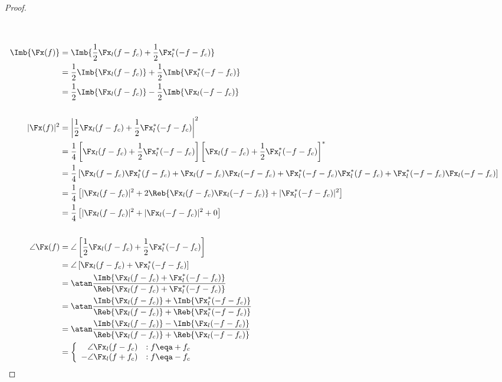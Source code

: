 \begin{proof}
\begin{align*}
\\ \\
   \Imb{\Fx(f)}
     &= \Imb{\frac{1}{2}\Fx_l(f-f_c) + \frac{1}{2}\Fx_l^\ast(-f-f_c)}
   \\&= \frac{1}{2}\Imb{\Fx_l(f-f_c)} + \frac{1}{2}\Imb{\Fx_l^\ast(-f-f_c)}
   \\&= \frac{1}{2}\Imb{\Fx_l(f-f_c)} - \frac{1}{2}\Imb{\Fx_l(-f-f_c)}
\\ \\
   |\Fx(f)|^2
     &= \left| \frac{1}{2}\Fx_l(f-f_c) + \frac{1}{2}\Fx_l^\ast(-f-f_c) \right|^2
   \\&= \frac{1}{4}
        \left[\Fx_l(f-f_c) + \frac{1}{2}\Fx_l^\ast(-f-f_c) \right]
        \left[\Fx_l(f-f_c) + \frac{1}{2}\Fx_l^\ast(-f-f_c) \right]^\ast
   \\&= \frac{1}{4} \left[
        \Fx_l     ( f-f_c) \Fx_l^\ast( f-f_c) +
        \Fx_l     ( f-f_c) \Fx_l     (-f-f_c) +
        \Fx_l^\ast(-f-f_c) \Fx_l^\ast( f-f_c) +
        \Fx_l^\ast(-f-f_c) \Fx_l     (-f-f_c)
        \right]
   \\&= \frac{1}{4} \left[
        |\Fx_l( f-f_c)|^2 +
        2\Reb{\Fx_l     ( f-f_c) \Fx_l     (-f-f_c)} +
        |\Fx_l^\ast(-f-f_c)|^2
        \right]
   \\&= \frac{1}{4} \left[
        |\Fx_l( f-f_c)|^2 + |\Fx_l(-f-f_c)|^2 + 0
        \right]
\\ \\
   \angle\Fx(f)
     &= \angle\left[ \frac{1}{2}\Fx_l(f-f_c) + \frac{1}{2}\Fx_l^\ast(-f-f_c) \right]
   \\&= \angle\left[ \Fx_l(f-f_c) + \Fx_l^\ast(-f-f_c) \right]
   \\&= \atan\frac{\Imb{\Fx_l(f-f_c) + \Fx_l^\ast(-f-f_c) }}
                  {\Reb{\Fx_l(f-f_c) + \Fx_l^\ast(-f-f_c) }}
   \\&= \atan\frac{\Imb{\Fx_l(f-f_c)} + \Imb{\Fx_l^\ast(-f-f_c) }}
                  {\Reb{\Fx_l(f-f_c)} + \Reb{\Fx_l^\ast(-f-f_c) }}
   \\&= \atan\frac{\Imb{\Fx_l(f-f_c)} - \Imb{\Fx_l(-f-f_c) }}
                  {\Reb{\Fx_l(f-f_c)} + \Reb{\Fx_l(-f-f_c) }}
   \\&= \left\{\begin{array}{rl}
         \angle\Fx_l(f-f_c) &:f\eqa +f_c \\
        -\angle\Fx_l(f+f_c) &:f\eqa -f_c
        \end{array}\right.
\end{align*}
\end{proof}



